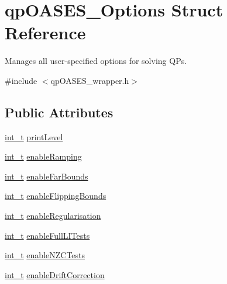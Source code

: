 \hypertarget{structqp_o_a_s_e_s___options}{}\section{qp\+O\+A\+S\+E\+S\+\_\+\+Options Struct Reference}
\label{structqp_o_a_s_e_s___options}


Manages all user-\/specified options for solving Q\+Ps.  




{\ttfamily \#include $<$qp\+O\+A\+S\+E\+S\+\_\+wrapper.\+h$>$}

\subsection*{Public Attributes}
\begin{DoxyCompactItemize}
\item 
\hyperlink{_types_8hpp_ab6fd6105e64ed14a0c9281326f05e623}{int\+\_\+t} \hyperlink{structqp_o_a_s_e_s___options_a6088fabf0daa3ecbae52e5c51b7d34f3}{print\+Level}
\item 
\hyperlink{_types_8hpp_ab6fd6105e64ed14a0c9281326f05e623}{int\+\_\+t} \hyperlink{structqp_o_a_s_e_s___options_a6a24b728aac71b065738858d90340c79}{enable\+Ramping}
\item 
\hyperlink{_types_8hpp_ab6fd6105e64ed14a0c9281326f05e623}{int\+\_\+t} \hyperlink{structqp_o_a_s_e_s___options_a64852540516411412e8fa530626e7275}{enable\+Far\+Bounds}
\item 
\hyperlink{_types_8hpp_ab6fd6105e64ed14a0c9281326f05e623}{int\+\_\+t} \hyperlink{structqp_o_a_s_e_s___options_a3b7ede46119fe9e685a7673821973c75}{enable\+Flipping\+Bounds}
\item 
\hyperlink{_types_8hpp_ab6fd6105e64ed14a0c9281326f05e623}{int\+\_\+t} \hyperlink{structqp_o_a_s_e_s___options_a2097669172e86625febce9309c2ca9ab}{enable\+Regularisation}
\item 
\hyperlink{_types_8hpp_ab6fd6105e64ed14a0c9281326f05e623}{int\+\_\+t} \hyperlink{structqp_o_a_s_e_s___options_a6b37fbe94a31b355a2f30a282aa97f41}{enable\+Full\+L\+I\+Tests}
\item 
\hyperlink{_types_8hpp_ab6fd6105e64ed14a0c9281326f05e623}{int\+\_\+t} \hyperlink{structqp_o_a_s_e_s___options_a03ac2d546d482acd3c7b75d234efe10a}{enable\+N\+Z\+C\+Tests}
\item 
\hyperlink{_types_8hpp_ab6fd6105e64ed14a0c9281326f05e623}{int\+\_\+t} \hyperlink{structqp_o_a_s_e_s___options_a1fdfa62d4afd2b098abefa1130e830cf}{enable\+Drift\+Correction}

\end{DoxyCompactItemize}
